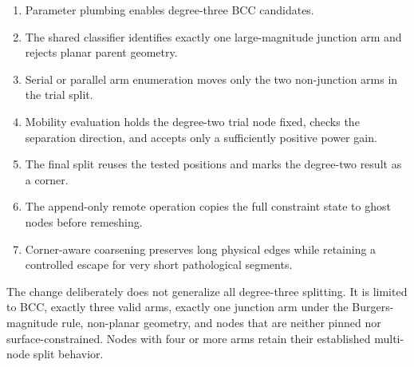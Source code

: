 \documentclass[11pt]{article}
\begin{document}
\begin{enumerate}
  \item Parameter plumbing enables degree-three BCC candidates.
  \item The shared classifier identifies exactly one large-magnitude junction
        arm and rejects planar parent geometry.
  \item Serial or parallel arm enumeration moves only the two non-junction
        arms in the trial split.
  \item Mobility evaluation holds the degree-two trial node fixed, checks the
        separation direction, and accepts only a sufficiently positive power
        gain.
  \item The final split reuses the tested positions and marks the degree-two
        result as a corner.
  \item The append-only remote operation copies the full constraint state to
        ghost nodes before remeshing.
  \item Corner-aware coarsening preserves long physical edges while retaining
        a controlled escape for very short pathological segments.
\end{enumerate}

The change deliberately does not generalize all degree-three splitting.  It
is limited to BCC, exactly three valid arms, exactly one junction arm under the
Burgers-magnitude rule, non-planar geometry, and nodes that are neither pinned
nor surface-constrained.  Nodes with four or more arms retain their established
multi-node split behavior.
\end{document}
